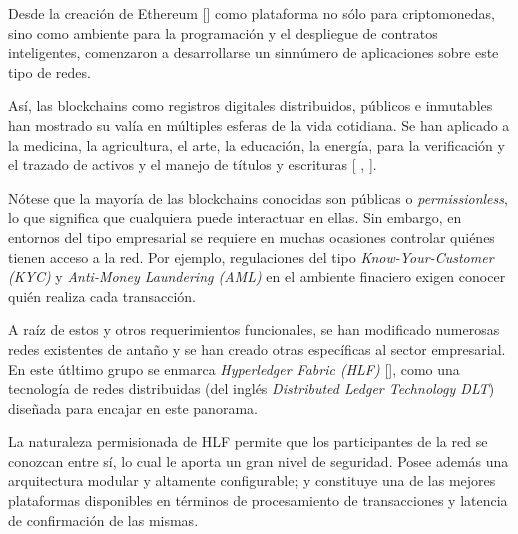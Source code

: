 Desde la creaci\'on de Ethereum [\cite{ethereum2014ethereum}] como plataforma no s\'olo para criptomonedas, sino como ambiente para la programaci\'on y el despliegue de contratos inteligentes, comenzaron a desarrollarse un sinn\'umero de aplicaciones sobre este tipo de redes.

As\'i, las blockchains como registros digitales distribuidos, p\'ublicos e inmutables han mostrado su val\'ia en m\'ultiples esferas de la vida cotidiana. Se han aplicado a la medicina, la agricultura, el arte, la educaci\'on, la energ\'ia, para la verificaci\'on y el trazado de activos y el manejo de t\'itulos y escrituras [\cite{engelhardt2017hitching} , \cite{abou2019blockchain}].



N\'otese que la mayor\'ia de las blockchains conocidas son p\'ublicas o \emph{permissionless}, lo que significa que cualquiera puede interactuar en ellas. Sin embargo, en entornos del tipo empresarial se requiere en muchas ocasiones controlar qui\'enes tienen acceso a la red. Por ejemplo, regulaciones del tipo \emph{Know-Your-Customer (KYC)} y \emph{Anti-Money Laundering (AML)} en el ambiente finaciero exigen conocer qui\'en realiza cada transacci\'on. 

A ra\'iz de estos y otros requerimientos funcionales, se han modificado numerosas redes existentes de anta\~no y se han creado otras espec\'ificas al sector empresarial. En este \'utltimo grupo se enmarca \emph{Hyperledger Fabric (HLF)} [\cite{androulaki2018hyperledger}], como una tecnolog\'ia de redes distribuidas (del ingl\'es \emph{Distributed Ledger Technology DLT}) dise\~nada para encajar en este panorama.%

La naturaleza permisionada de HLF permite que los participantes de la red se conozcan entre s\'i, lo cual le aporta un gran nivel de seguridad. 
Posee adem\'as una arquitectura modular y altamente configurable; y constituye una de las mejores plataformas disponibles en t\'erminos de procesamiento de transacciones y latencia de confirmaci\'on de las mismas. %

